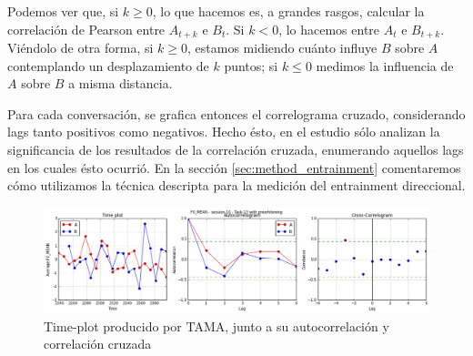Podemos ver que, si $k \geq 0$, lo que hacemos es, a grandes rasgos, calcular la correlación de Pearson entre $A_{t+k}$ e $B_t$. Si $k < 0$, lo hacemos entre $A_t$ e $B_{t+k}$. Viéndolo de otra forma, si $k \geq 0$, estamos midiendo cuánto influye $B$ sobre $A$ contemplando un desplazamiento de $k$ puntos; si $k \leq 0$ medimos la influencia de $A$ sobre $B$ a misma distancia.


Para cada conversación, se grafica entonces el correlograma cruzado, considerando lags tanto positivos como negativos. Hecho ésto, en el estudio \cite{KOU2008.2} sólo analizan la significancia de los resultados de la correlación cruzada, enumerando aquellos lags en los cuales ésto ocurrió. En la sección \ref{sec:method_entrainment} comentaremos cómo utilizamos la técnica descripta para la medición del entrainment direccional.



\begin{figure}
\centering
\includegraphics[width=15cm]{images/time_plot_with_cross_correlation.png}
\caption{Time-plot producido por TAMA, junto a su autocorrelación y correlación cruzada}
\end{figure}
